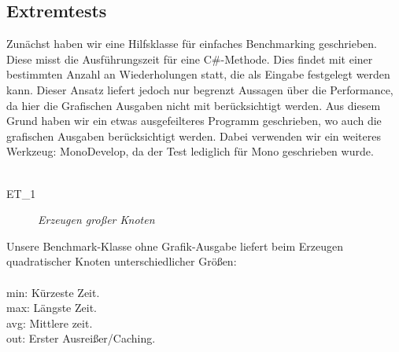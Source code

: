 %



\newpage



\label{Abschnitt:Tests:Protokoll:Extrem}



\subsection*{Extremtests}


Zunächst haben wir eine Hilfsklasse für einfaches Benchmarking geschrieben. Diese misst die Ausführungszeit für eine C\#-Methode. Dies findet mit einer bestimmten Anzahl an Wiederholungen statt, die als Eingabe festgelegt werden kann. Dieser Ansatz liefert jedoch nur begrenzt Aussagen über die Performance, da hier die Grafischen Ausgaben nicht mit berücksichtigt werden. Aus diesem Grund haben wir ein etwas ausgefeilteres Programm geschrieben, wo auch die grafischen Ausgaben berücksichtigt werden. Dabei verwenden wir ein weiteres Werkzeug: MonoDevelop, da der Test lediglich für Mono geschrieben wurde.\\~\\


\label{Abschnitt:Tests:Protokoll:Extrem:Knoten_Erzeugen}

\begin{description}

	\item[ET\_1] \textit{Erzeugen großer Knoten}\hfill\\
	
\end{description}

Unsere Benchmark-Klasse ohne Grafik-Ausgabe liefert beim Erzeugen quadratischer Knoten unterschiedlicher Größen:\\~\\

\noindent
min: Kürzeste Zeit.\\
max: Längste Zeit.\\
avg: Mittlere zeit.\\
out: Erster Ausreißer/Caching.\\

~\\

